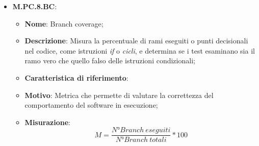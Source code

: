 \documentclass[10pt, a4paper]{article}
\begin{document}
\begin{itemize}
    \item \textbf{M.PC.8.BC}:
    \begin{itemize}
        \item \textbf{Nome}: Branch coverage;
        \item \textbf{Descrizione}: Misura la percentuale di rami eseguiti o punti decisionali nel codice, come istruzioni \textit{if} o \textit{cicli}, e determina se i test esaminano sia il ramo vero che quello falso delle istruzioni condizionali;
        \item \textbf{Caratteristica di riferimento}:
        \item \textbf{Motivo}: Metrica che permette di valutare la correttezza del comportamento del software in esecuzione;
        \item \textbf{Misurazione}:  \[M=\frac{N° Branch \ eseguiti}{N° Branch\ totali} * 100 \] \\
    \end{itemize}
    
\end{itemize}
\end{document}
